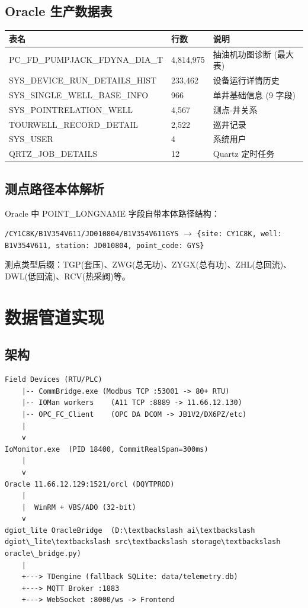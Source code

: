 \documentclass[12pt,a4paper]{ctexart}
\begin{document}
\subsection{Oracle 生产数据表}

\begin{longtable}{p{5cm}p{2.5cm}p{5cm}}
\toprule
\textbf{表名} & \textbf{行数} & \textbf{说明} \\
\midrule
PC\_FD\_PUMPJACK\_FDYNA\_DIA\_T & 4,814,975 & 抽油机功图诊断 (最大表) \\
SYS\_DEVICE\_RUN\_DETAILS\_HIST & 233,462 & 设备运行详情历史 \\
SYS\_SINGLE\_WELL\_BASE\_INFO & 966 & 单井基础信息 (9 字段) \\
SYS\_POINTRELATION\_WELL & 4,567 & 测点-井关系 \\
TOURWELL\_RECORD\_DETAIL & 2,522 & 巡井记录 \\
SYS\_USER & 4 & 系统用户 \\
QRTZ\_JOB\_DETAILS & 12 & Quartz 定时任务 \\
\bottomrule
\end{longtable}

\subsection{测点路径本体解析}

Oracle 中 POINT\_LONGNAME 字段自带本体路径结构：

\texttt{/CY1C8K/B1V354V611/JD010804/B1V354V611GYS}
$\rightarrow$ \texttt{\{site: CY1C8K, well: B1V354V611, station: JD010804, point\_code: GYS\}}

测点类型后缀：TGP(套压)、ZWG(总无功)、ZYGX(总有功)、ZHL(总回流)、DWL(低回流)、RCV(热采阀)等。

\section{数据管道实现}

\subsection{架构}

\begin{lstlisting}[caption=数据管道 Architecture]
Field Devices (RTU/PLC)
    |-- CommBridge.exe (Modbus TCP :53001 -> 80+ RTU)
    |-- IOMan workers    (A11 TCP :8889 -> 11.66.12.130)
    |-- OPC_FC_Client    (OPC DA DCOM -> JB1V2/DX6PZ/etc)
    |
    v
IoMonitor.exe  (PID 18400, CommitRealSpan=300ms)
    |
    v
Oracle 11.66.12.129:1521/orcl (DQYTPROD)
    |
    |  WinRM + VBS/ADO (32-bit)
    v
dgiot_lite OracleBridge  (D:\textbackslash ai\textbackslash dgiot\_lite\textbackslash src\textbackslash storage\textbackslash oracle\_bridge.py)
    |
    +---> TDengine (fallback SQLite: data/telemetry.db)
    +---> MQTT Broker :1883
    +---> WebSocket :8000/ws -> Frontend
\end{lstlisting}
\end{document}
